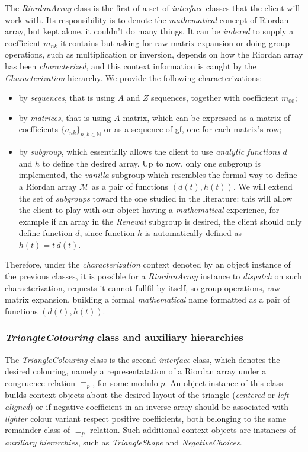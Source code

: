 The \emph{RiordanArray} class is the first of a set of \emph{interface} classes
that the client will work with.  Its responsibility is to denote the
\emph{mathematical} concept of Riordan array, but kept alone, it couldn't do
many things. It can be \emph{indexed} to supply a coefficient $m_{nk}$ it
contains but asking for raw matrix expansion or doing group operations, such as
multiplication or inversion, depends on how the Riordan array has been
\emph{characterized}, and this context information is caught by the
\emph{Characterization} hierarchy. We provide the following characterizations:
\begin{itemize}
    \item by \emph{sequences}, that is using $A$ and $Z$ sequences, together with
        coefficient $m_{00}$;
    \item by \emph{matrices}, that is using $A$-matrix, which can be expressed as a
        matrix of coefficients $\lbrace a_{nk}\rbrace_{n,k\in\mathbb{N}}$ or as a 
        sequence of \ac{gf}, one for each matrix's row;
    \item by \emph{subgroup}, which essentially allows the client to use \emph{analytic
        functions} $d$ and $h$ to define the desired array. Up to now, only one
        subgroup is implemented, the \emph{vanilla} subgroup which resembles the
        formal way to define a Riordan array $\mathcal{M}$ as a pair of functions $(d(t),h(t))$.
        We will extend the set of \emph{subgroups} toward the one studied in the literature:
        this will allow the client to play with our object having a \emph{mathematical}
        experience, for example if an array in the \emph{Renewal} subgroup is desired,
        the client should only define function $d$, since function $h$ is automatically
        defined as $h(t)=t\,d(t)$.
\end{itemize}
Therefore, under the \emph{characterization} context denoted by an object instance of the
previous classes, it is possible for a \emph{RiordanArray} instance to \emph{dispatch} on such
characterization, requests it cannot fullfil by itself, so group operations, raw matrix expansion,
building a formal \emph{mathematical} name formatted as a pair of functions $(d(t),h(t))$.

\subsubsection{\emph{TriangleColouring} class and auxiliary hierarchies}

The \emph{TriangleColouring} class is the second \emph{interface} class, which
denotes the desired colouring, namely a representatation of a Riordan array
under a congruence relation $\equiv_{p}$, for some modulo $p$. An object
instance of this class builds context objects about the desired layout of the
triangle (\emph{centered} or \emph{left-aligned}) or if negative coefficient in
an inverse array should be associated with \emph{lighter} colour variant
respect positive coefficients, both belonging to the same remainder class of
$\equiv_{p}$ relation. Such additional context objects are instances of \emph{auxiliary
hierarchies}, such as \emph{TriangleShape} and \emph{NegativeChoices}.

